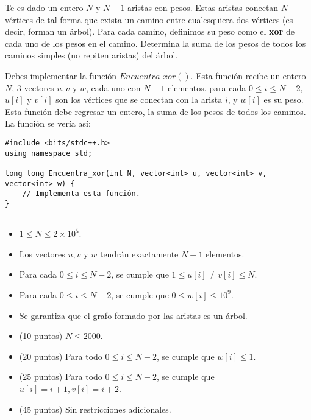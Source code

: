 \documentclass[12pt]{scrartcl}
\begin{document}
    
    
    \vspace{10pt}

    
    
        Te es dado un entero $N$ y $N - 1$ aristas con pesos. Estas aristas conectan $N$ vértices de tal forma que exista un camino entre cualesquiera dos vértices (es decir, forman un árbol). Para cada camino, definimos su peso como el {\bfseries xor } de cada uno de los pesos en el camino. Determina la suma de los pesos de todos los caminos simples (no repiten aristas) del árbol.
    

        Debes implementar la función $Encuentra\_xor()$. Esta función recibe un entero $N$, 3 vectores $u, v$ y $w$, cada uno con $N - 1$ elementos. para cada $0 \le i \le N - 2$, $u[i]$ y $v[i]$ son los vértices que se conectan con la arista $i$, y $w[i]$ es su peso. Esta función debe regresar un entero, la suma de los pesos de todos los caminos.
        La función se vería así:

\begin{verbatim}
#include <bits/stdc++.h>
using namespace std;

long long Encuentra_xor(int N, vector<int> u, vector<int> v, vector<int> w) {
    // Implementa esta función.
}
    
\end{verbatim}

        \begin{itemize}
            \item $1 \le N \le 2\times10^5$.
            \item Los vectores $u, v$ y $w$ tendrán exactamente $N - 1$ elementos.
            \item Para cada $0 \le i \le N - 2$, se cumple que $1 \le u[i] \neq v[i] \le N$. 
            \item Para cada $0 \le i \le N - 2$, se cumple que $0 \le w[i] \le 10^9$.
            \item Se garantiza que el grafo formado por las aristas es un árbol.
        \end{itemize}
    


    \begin{itemize}
        \item (10 puntos) $N \le 2000$.
        \item (20 puntos) Para todo $0 \le i \le N - 2$, se cumple que $w[i] \le 1$.
        \item (25 puntos) Para todo $0 \le i \le N - 2$, se cumple que $u[i] = i + 1, v[i] = i + 2$.
        \item (45 puntos) Sin restricciones adicionales.
    \end{itemize}
\end{document}
